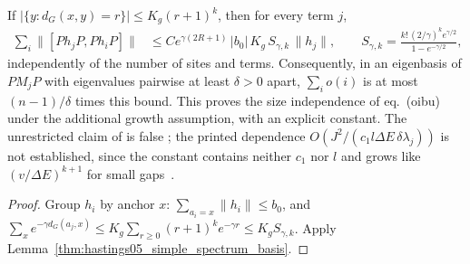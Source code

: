 \begin{lemma}
    \label{thm:hastings05_oibu}
    \leanok
    If $|\{y:d_G(x,y)=r\}|\le K_g(r+1)^k$, then for every term $j$,
    \begin{align}
        \sum_i\|[Ph_jP,Ph_iP]\|
         & \le Ce^{\gamma(2R+1)}\,|b_0|\,K_g\,S_{\gamma,k}\,\|h_j\|,
        \qquad
        S_{\gamma,k}=\frac{k!\,(2/\gamma)^ke^{\gamma/2}}{1-e^{-\gamma/2}},
        \label{eq:hastings05_oibu}
    \end{align}
    independently of the number of sites and terms. Consequently, in an
    eigenbasis of $PM_jP$ with eigenvalues pairwise at least $\delta>0$ apart,
    $\sum_io(i)$ is at most $(n-1)/\delta$ times this bound. This proves the
    size independence of eq.~(oibu) under the additional growth assumption,
    with an explicit constant. The unrestricted claim of
    \cite[lines 1689--1694]{Hastings2006Solving} is false
    \cite{gap:hastings05_tree_basis_counterexample}; the printed dependence
    $O(J^2/(c_1l\Delta E\,\delta\lambda_j))$ is not established, since the
    constant contains neither $c_1$ nor $l$ and grows like $(v/\Delta E)^{k+1}$
    for small gaps~\cite{gap:hastings05_two_dim_ground_basis}.
\end{lemma}
\begin{proof}\leanok
    Group $h_i$ by anchor $x$: $\sum_{a_i=x}\|h_i\|\le b_0$, and
    $\sum_xe^{-\gamma d_G(a_j,x)}\le K_g\sum_{r\ge0}(r+1)^ke^{-\gamma r}\le K_gS_{\gamma,k}$.
    Apply Lemma~\ref{thm:hastings05_simple_spectrum_basis}.
\end{proof}

